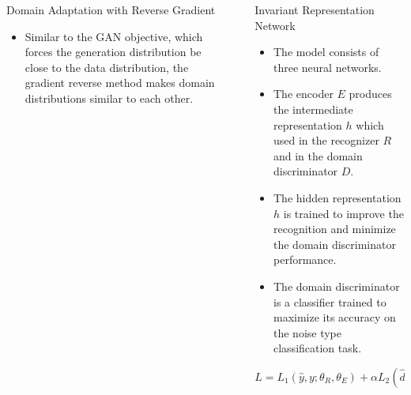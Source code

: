 \documentclass[final]{beamer}
\newlength{\sepwid}
\newlength{\onecolwid}
\newlength{\twocolwid}
\begin{document}
\begin{frame}[t]
\begin{columns}[t]
\begin{column}{\onecolwid}
\begin{block}{Domain Adaptation with Reverse Gradient}
\begin{itemize}
        \item Similar to the GAN objective, which forces the generation distribution be close to the data distribution,
        the \textcolor{dblue}{gradient reverse method} makes domain distributions similar to each other.
    \end{itemize}
    
\end{block}

\end{column} %

\begin{column}{\sepwid}\end{column} %

\begin{column}{\twocolwid}

    \begin{columns}[t]

        \begin{column}{\onecolwid} %
            \begin{block}{{\Large Invariant Representation Network}}
                \begin{itemize}
                    \item The model consists of three neural networks. 
                    \item The encoder $E$ produces
                        the intermediate representation $h$ which used in the recognizer $R$ and 
                        in the domain discriminator $D$. 
                    \item The hidden representation $h$ is trained to improve
                        the recognition and minimize the domain discriminator performance. 
                    \item The domain discriminator
                        is a classifier trained to maximize its accuracy on the noise type
                        classification task.
                \end{itemize}
                \begin{equation*}
                    L = L_1(\hat{y}, y; \theta_R, \theta_E) + 
                    \alpha L_2(\hat{d}, d; \theta_D) -
                    \beta L_3(\hat{d}, d; \theta_E)
                \end{equation*}


\end{block}
\end{column}
\end{columns}
\end{column}
\end{columns}
\end{frame}
\end{document}
